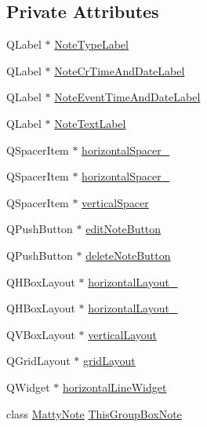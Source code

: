 \subsection*{Private Attributes}
\begin{DoxyCompactItemize}
\item 
Q\+Label $\ast$ \hyperlink{classMattyGroupBox_a7bd564ef71ea2331a316d2fc6792ef09}{Note\+Type\+Label}
\item 
Q\+Label $\ast$ \hyperlink{classMattyGroupBox_a1a71503d5ede703b934e4f02d932a038}{Note\+Cr\+Time\+And\+Date\+Label}
\item 
Q\+Label $\ast$ \hyperlink{classMattyGroupBox_a97b192413385021b01b34db7493f8b49}{Note\+Event\+Time\+And\+Date\+Label}
\item 
Q\+Label $\ast$ \hyperlink{classMattyGroupBox_a2243d04d95c060e516fa3a43f09f19ef}{Note\+Text\+Label}
\item 
Q\+Spacer\+Item $\ast$ \hyperlink{classMattyGroupBox_a6b2678b09a3c56c18f357775e83b76c0}{horizontal\+Spacer\+\_}
\item 
Q\+Spacer\+Item $\ast$ \hyperlink{classMattyGroupBox_a633d989baf5de2db6d0c01702ba6b410}{horizontal\+Spacer\+\_}
\item 
Q\+Spacer\+Item $\ast$ \hyperlink{classMattyGroupBox_ae622d8330b00272995af1d41ce037b4c}{vertical\+Spacer}
\item 
Q\+Push\+Button $\ast$ \hyperlink{classMattyGroupBox_a3237eef2287c1b2fcff14d226ef9116d}{edit\+Note\+Button}
\item 
Q\+Push\+Button $\ast$ \hyperlink{classMattyGroupBox_ab51a570cfe8b06f8ae06a7163fb09d4f}{delete\+Note\+Button}
\item 
Q\+H\+Box\+Layout $\ast$ \hyperlink{classMattyGroupBox_a5d52dd2e01ba1a5d155e056ea438f142}{horizontal\+Layout\+\_}
\item 
Q\+H\+Box\+Layout $\ast$ \hyperlink{classMattyGroupBox_a053f7794bcd10214414d41e9c09663e0}{horizontal\+Layout\+\_}
\item 
Q\+V\+Box\+Layout $\ast$ \hyperlink{classMattyGroupBox_a2fc280283ef68a61828fe26007c949f1}{vertical\+Layout}
\item 
Q\+Grid\+Layout $\ast$ \hyperlink{classMattyGroupBox_a02436c3690d2007eb0cba523bcb668ea}{grid\+Layout}
\item 
Q\+Widget $\ast$ \hyperlink{classMattyGroupBox_a34f61735914e5235c4bf58841e647f06}{horizontal\+Line\+Widget}
\item 
class \hyperlink{classMattyNote}{Matty\+Note} \hyperlink{classMattyGroupBox_a00ca2ef39a0b5aca9e83373777bed395}{This\+Group\+Box\+Note}
\end{DoxyCompactItemize}


